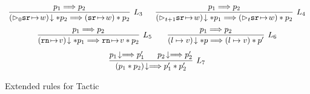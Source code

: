 \begin{figure}[!t]
    \[
        \begin{array}{c}
            \infer[L_3]
            {
                \nxtAst{(\dlyregst{0}{\sr}{\word})} \sepstar \astP_2 \Longrightarrow 
                (\regst{\sr}{\word}) \sepstar \astP_2
            }
            {
                \astP_1 \Longrightarrow \astP_2
            } \quad \ \ 
            \infer[L_4]
            {
                \nxtAst{(\dlyregst{t+1}{\sr}{\word})} \sepstar \astP_1 \Longrightarrow 
                (\dlyregst{t}{\sr}{\word}) \sepstar \astP_2
            }
            {
                \astP_1 \Longrightarrow \astP_2
            } \\
            \\[-5pt]
            \infer[L_5]
            {
                \nxtAst{(\regst{\regN}{\val})} \sepstar \astP_1 \Longrightarrow 
                \regst{\regN}{\val} \sepstar \astP_2
            }
            {
                \astP_1 \Longrightarrow \astP_2
            } \qquad 
            \infer[L_6]
            {
                \nxtAst{(\sepsto{\loc}{\val})} \sepstar \astP \Longrightarrow 
                (\sepsto{\loc}{\val}) \sepstar \astP'
            }
            {
                \astP_1 \Longrightarrow \astP_2
            } \\
            \\[-5pt]
            \infer[L_7]
            {
                \nxtAst{(\astP_1 \sepstar \astP_2)}
                \Longrightarrow 
                \astP_1' \sepstar \astP_2'
            }
            {
                \nxtAst{\astP_1} \Longrightarrow \astP_1' \quad \ \ 
                \nxtAst{\astP_2} \Longrightarrow \astP_2'
            } 
        \end{array}
    \]
    \caption{Extended rules for Tactic \sepcancel{}}
    \label{fig:ext-rule-tac-sepcancel}
\end{figure}
